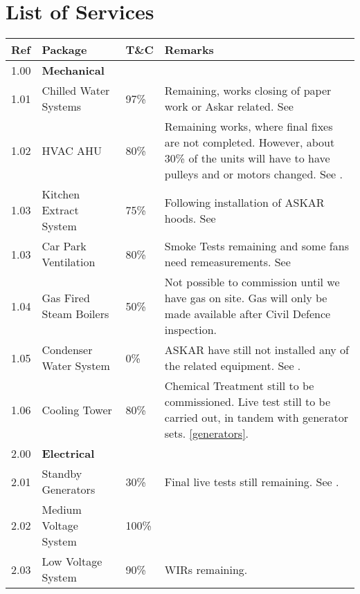 \section*{List of Services}


\label{masterplan}
{\RaggedRight\small
\begin{longtable}{lllp{4.3cm}@{}}
\toprule
Ref	&Package	&T\&C	&Remarks\\
\midrule
1.00	&\textbf{Mechanical}	&	&\\
1.01	&Chilled Water Systems	&97\%	&Remaining, works closing of paper work or Askar related. See {chilledwater}\\

1.02	&HVAC AHU  & 80\%		&  Remaining works, where final fixes are not completed. However, about 30\% of the units will have to have pulleys and or motors changed. See {HVAC}.\\

1.03    &Kitchen Extract System &75\%& Following installation of ASKAR hoods. See {kitchenextract}\\

1.03	&Car Park Ventilation 	&80\%&Smoke Tests remaining and some fans need remeasurements. See {carparkventilation}\\

1.04	&Gas Fired Steam Boilers &50\%&Not possible to commission until we have gas on site. Gas will only be made available after Civil Defence inspection.	\\

1.05	&Condenser Water System 	&0\%&ASKAR have still not installed any of the related equipment. See {chilledwaterconstraints}.    \\

1.06    &Cooling Tower &80\%&Chemical Treatment still to be commissioned. Live test still to be carried out, in tandem with generator sets. \ref{generators}.  \\
\midrule

2.00	&\textbf{Electrical}		&&\\
2.01	&Standby Generators	&30\%& Final live tests still remaining. See \sref{generators}. \\
	
2.02	&Medium Voltage System	&100\%&\\	

2.03	&Low Voltage System		&90\%&WIRs remaining.\\


\end{longtable}}
